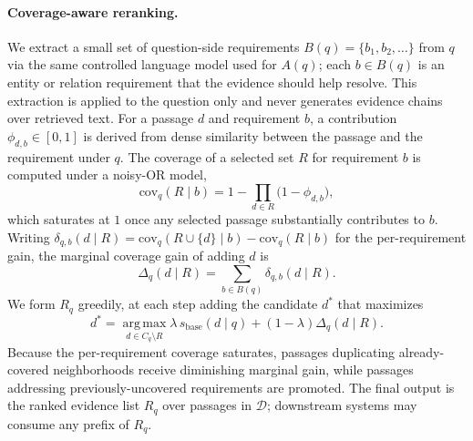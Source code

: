 \paragraph{Coverage-aware reranking.}
We extract a small set of question-side requirements
$B(q)=\{b_1,b_2,\ldots\}$ from $q$ via the same controlled language model
used for $A(q)$; each $b\in B(q)$ is an entity or relation requirement
that the evidence should help resolve. This extraction is applied to the
question only and never generates evidence chains over retrieved text.
For a passage $d$ and requirement $b$, a contribution
$\phi_{d,b}\in[0,1]$ is derived from dense similarity between the
passage and the requirement under $q$. The coverage of a selected set
$R$ for requirement $b$ is computed under a noisy-OR model,
\begin{equation}
\label{eq:noisy-or}
\mathrm{cov}_q(R \mid b)
=
1 - \prod_{d \in R}\bigl(1 - \phi_{d,b}\bigr),
\end{equation}
which saturates at $1$ once any selected passage substantially
contributes to $b$. Writing
$\delta_{q,b}(d \mid R)=\mathrm{cov}_q(R \cup \{d\}\mid b)-\mathrm{cov}_q(R\mid b)$
for the per-requirement gain, the marginal coverage gain of adding $d$ is
\begin{equation}
\label{eq:marginal-gain}
\Delta_q(d \mid R) = \sum_{b \in B(q)} \delta_{q,b}(d \mid R).
\end{equation}
We form $R_q$ greedily, at each step adding the candidate $d^*$ that
maximizes
\begin{equation}
\label{eq:greedy-rerank}
d^{*}
=
\operatorname*{arg\,max}_{d \in C_q \setminus R}
\lambda\,s_{\mathrm{base}}(d \mid q)
+
(1-\lambda)\Delta_q(d \mid R).
\end{equation}
Because the per-requirement coverage saturates, passages duplicating
already-covered neighborhoods receive diminishing marginal gain, while
passages addressing previously-uncovered requirements are promoted. The
final output is the ranked evidence list $R_q$ over passages in
$\mathcal{D}$; downstream systems may consume any prefix of $R_q$.
